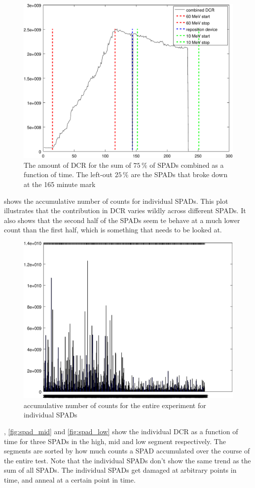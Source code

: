 \begin{figure}[h]
\centering
	\includegraphics[width=0.6\linewidth]{fig/count_vs_time_sum_some.pdf}
\caption{The amount of DCR for the sum of $75\,\%$ of SPADs combined as a function of time. The left-out $25\,\%$ are the SPADs that broke down at the 165 minute mark}
\label{fig:count_vs_time_sum_some}
\end{figure}

 shows the accumulative number of counts for individual SPADs. This plot illustrates that the contribution in DCR varies wildly across different SPADs. It also shows that the second half of the SPADs seem te behave at a much lower count than the first half, which is something that needs to be looked at.

\begin{figure}[h]
\centering
	\includegraphics[width=0.6\linewidth]{fig/bars.pdf}
\caption{accumulative number of counts for the entire experiment for individual SPADs}
\label{fig:bars}
\end{figure}

, \cref{fig:spad_mid} and \cref{fig:spad_low} show the individual DCR as a function of time for three SPADs in the high, mid and low segment respectively. The segments are sorted by how much counts a SPAD accumulated over the course of the entire test. Note that the individual SPADs don't show the same trend as the sum of all SPADs. The individual SPADs get damaged at arbitrary points in time, and anneal at a certain point in time. 

